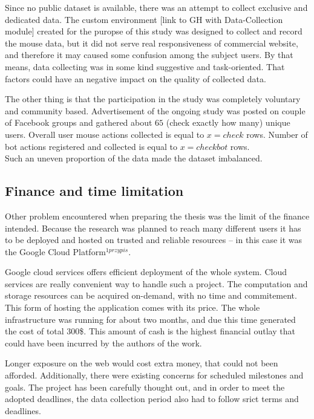 Since no public dataset is available, there was an attempt to collect exclusive and dedicated data.
The custom environment [link to GH with Data-Collection module] created for the puropse of this study was designed to collect and record the mouse data, but it did not serve real responsiveness of commercial website, and therefore it may caused some confusion among the subject users. By that means, data collecting was in some kind suggestive and task-oriented. That factors could have an negative impact on the quality of collected data.

The other thing is that the participation in the study was completely voluntary and community based.
Advertisement of the ongoing study was posted on couple of Facebook groups and gathered about $65$ (check exactly how many) unique users. Overall user mouse actions collected is equal to $x=check$ rows.
Number of bot actions registered and collected is equal to $x=checkbot$ rows.\\
Such an uneven proportion of the data made the dataset imbalanced.

\subsection{Finance and time limitation}
Other problem encountered when preparing the thesis was the limit of the finance intended. Because the research was planned to reach many different users it has to be deployed and hosted on trusted and reliable resources – in this case it was the Google Cloud Platform$^{1przypis}$.

Google cloud services offers efficient deployment of the whole system.
Cloud services are really convenient way to handle such a project.
The computation and storage resources can be acquired on-demand, with no time and commitement. This form of hosting the application comes with its price.
The whole infrastructure was running for about two months, and due this time generated the cost of total 300\$.
This amount of cash is the highest financial outlay that could have been incurred by the authors of the work.

Longer exposure on the web would cost extra money, that could not been afforded. Additionally, there were existing concerns for scheduled milestones and goals. The project has been carefully thought out, and in order to meet the adopted deadlines, the data collection period also had to follow srict terms and deadlines.


